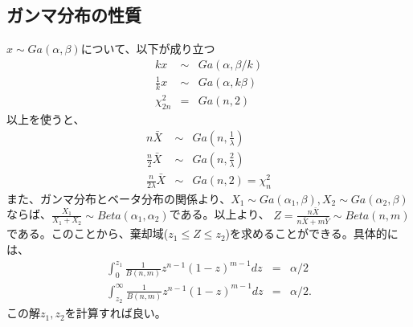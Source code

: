 
\subsection{ガンマ分布の性質}
$x\sim Ga(\alpha,\beta)$について、以下が成り立つ
\begin{eqnarray}
    k x &\sim& Ga(\alpha,\beta/k) \\
    \frac{1}{k} x &\sim& Ga(\alpha,k\beta)\\
    \chi^2_{2n}&=&Ga(n,2) 
\end{eqnarray}
以上を使うと、
\begin{eqnarray*}
    n\bar{X} &\sim& Ga\left(n,\frac{1}{\lambda}\right) \\
    \frac{n}{2}\bar{X} &\sim& Ga\left(n,\frac{2}{\lambda}\right) \\
    \frac{n}{2\lambda}\bar{X} &\sim& Ga\left(n,2 \right)=\chi^2_{n}
\end{eqnarray*}
また、ガンマ分布とベータ分布の関係より、$X_1 \sim Ga(\alpha_1,\beta),X_2\sim Ga(\alpha_2,\beta)$ならば、$\frac{X_1}{X_1+X_2}\sim Beta(\alpha_1,\alpha_2)$である。以上より、
$Z=\frac{n\bar{X}}{n\bar{X}+m\bar{Y}}\sim Beta(n,m)$である。このことから、棄却域($z_1 \leq Z \leq z_2$)を求めることができる。具体的には、
\begin{eqnarray}
    \int_0^{z_1}\frac{1}{B(n,m)}z^{n-1}(1-z)^{m-1}dz &=& \alpha/2 \\
    \int_{z_2}^{\infty}\frac{1}{B(n,m)}z^{n-1}(1-z)^{m-1}dz &=& \alpha/2.
\end{eqnarray}
この解$z_1,z_2$を計算すれば良い。




